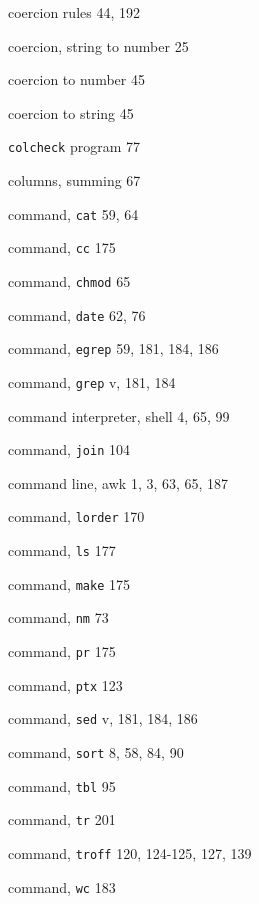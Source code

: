 \begin{multicols}{2}
coercion rules 44, 192

coercion, string to number 25

coercion to number 45

coercion to string 45

\verb'colcheck' program 77

columns, summing 67

command, \verb'cat' 59, 64

command, \verb'cc' 175

command, \verb'chmod' 65

command, \verb'date' 62, 76

command, \verb'egrep' 59, 181, 184, 186

command, \verb'grep' v, 181, 184

command interpreter, shell 4, 65, 99

command, \verb'join' 104

command line, awk 1, 3, 63, 65, 187

command, \verb'lorder' 170

command, \verb'ls' 177

command, \verb'make' 175

command, \verb'nm' 73

command, \verb'pr' 175

command, \verb'ptx' 123

command, \verb'sed' v, 181, 184, 186

command, \verb'sort' 8, 58, 84, 90

command, \verb'tbl' 95

command, \verb'tr' 201

command, \verb'troff' 120, 124-125, 127, 139

command, \verb'wc' 183
\end{multicols}
